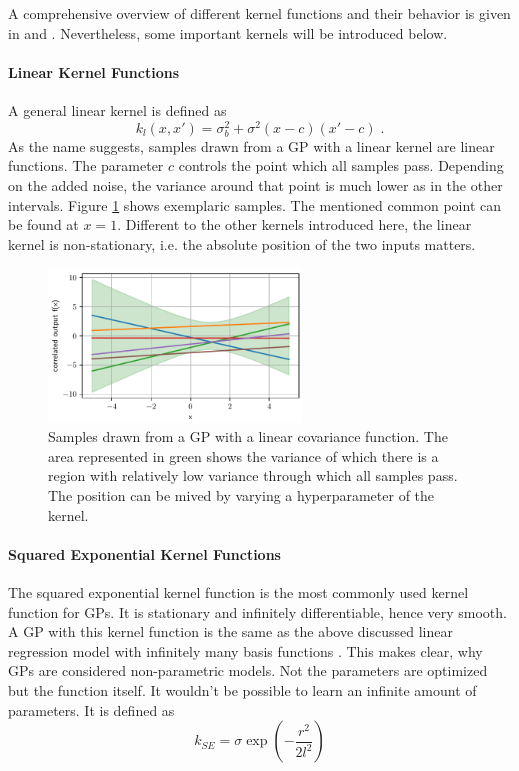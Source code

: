 \documentclass[%
  a4paper,oneside,%
  11pt,%
  smallchapters,
  style=printdev,
  extramargin,
  green,%
  rgb, <cmyk>
  ]{tubsbook}
\begin{document}
A comprehensive overview of different kernel functions and their behavior is given in \cite{Duvenaud} and \cite{gortler2019}. Nevertheless, some important kernels will be introduced below.
%

\paragraph{Linear Kernel Functions}
A general linear kernel is defined as
\begin{equation}
k_l(x,x') = \sigma_b^2 + \sigma^2 (x-c) (x'-c) \;.
\end{equation}
As the name suggests, samples drawn from a GP with a linear kernel are linear functions. The parameter $c$ controls the point which all samples pass. Depending on the added noise, the variance around that point is much lower as in the other intervals. Figure \ref{fig:Linear} shows exemplaric samples. The mentioned common point can be found at $x=1$. Different to the other kernels introduced here, the linear kernel is non-stationary, i.e. the absolute position of the two inputs matters.
\begin{figure}[!ht]
\begin{center}
\includegraphics[width=0.6\textwidth]{pics/LinearKernel.pdf}
\caption[Samples from a GP with linear kernel]{Samples drawn from a GP with a linear covariance function. The area represented in green shows the variance of which there is a region with relatively low variance through which all samples pass. The position can be mived by varying a hyperparameter of the kernel.}
\label{fig:Linear}
\end{center}
\end{figure}



\paragraph{Squared Exponential Kernel Functions}
The squared exponential kernel function is the most commonly used kernel function for GPs. It is stationary and infinitely differentiable, hence very smooth. A GP with this kernel function is the same as the above discussed linear regression model with infinitely many basis functions \cite{rasmussen2006}. This makes clear, why GPs are considered non-parametric models. Not the parameters are optimized but the function itself. It wouldn't be possible to learn an infinite amount of parameters.
It is defined as
\begin{equation}
k_{SE} = \sigma \exp(-\frac{r^2}{2l^2})
\end{equation}
\end{document}
